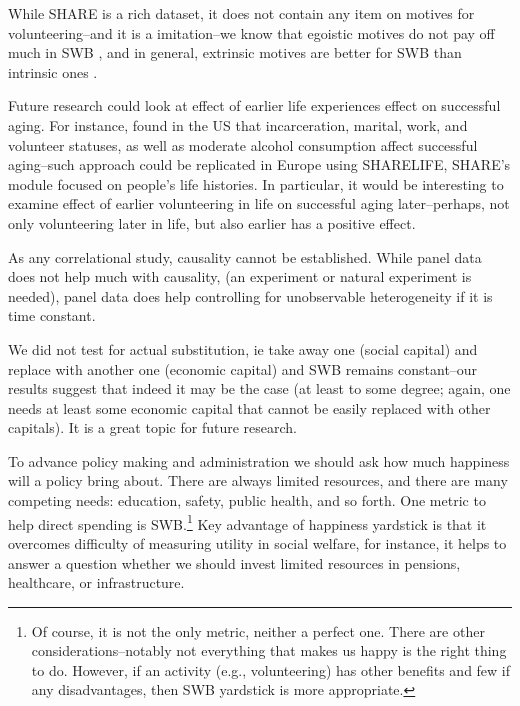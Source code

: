 \documentclass[10pt, letterpaper]{article}
\begin{document}
\begin{spacing}{1.4}
While SHARE is a rich dataset, it does not contain any item on motives for
volunteering--and it is a imitation--we know that egoistic motives do not pay
off much in SWB \citep{wiwad17}, and in general, extrinsic motives are better
for SWB than intrinsic ones \citep{schmuck00,ryan99,morrison17}.

Future research could look at effect of earlier life experiences effect on successful
aging. For instance, \citet{pruchno2010successful,pruchno2010two} found in the US that incarceration,
 marital, work, and volunteer statuses, as well as moderate
alcohol consumption affect successful aging--such approach could be
replicated in Europe using SHARELIFE, SHARE's module focused on people's life
histories. In particular, it would be interesting to examine effect of earlier
volunteering in life on successful aging later--perhaps, not only
volunteering later in life, but also earlier has a positive effect. 

As any correlational study, causality cannot be established. While panel data
does not help much with causality,  (an experiment or natural experiment is
needed), panel data does help controlling for unobservable heterogeneity if it is
time constant. 

We did not test for actual substitution, ie take away one (social  capital) and replace
with another one (economic capital) and SWB remains constant--our results
suggest that indeed it may be the case (at least to some degree; again, one
needs at least some economic capital that cannot be easily replaced with other
capitals). It is a great topic for future research.

To advance policy making and
administration we should ask how much happiness will a policy bring
about. There are always limited resources, and there are many competing needs: education, safety, public
health, and so forth. One metric to help direct spending is SWB.\footnote{Of
  course, it is not the only metric, neither a perfect one. There are other
  considerations--notably not everything that makes us happy is the right thing
  to do. However, if an activity (e.g., volunteering) has other benefits and few if any
  disadvantages, then SWB yardstick is more appropriate.}
Key  advantage of happiness yardstick is that it overcomes difficulty
of measuring utility in social welfare, for instance, it helps to answer
a question whether we should  invest
limited resources in pensions, healthcare, or infrastructure.


\end{spacing}
\end{document}
